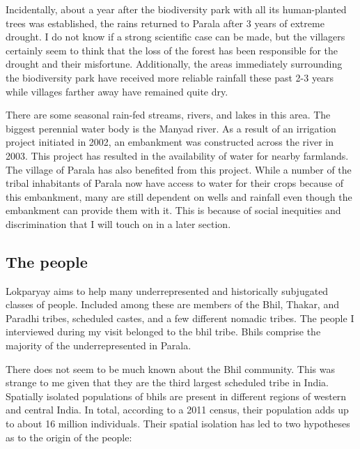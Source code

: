 \documentclass{article}
\begin{document}
Incidentally, about a year after the biodiversity park with all its human-planted trees was established, the rains returned to Parala after 3 years of extreme drought. I do not know if a strong scientific case can be made, but the villagers certainly seem to think that the loss of the forest has been responsible for the drought and their misfortune. Additionally, the areas immediately surrounding the biodiversity park have received more reliable rainfall these past 2-3 years while villages farther away have remained quite dry. 

There are some seasonal rain-fed streams, rivers, and lakes in this area. The biggest perennial water body is the Manyad river. As a result of an irrigation project initiated in 2002, an embankment was constructed across the river in 2003. This project has resulted in the availability of water for nearby farmlands. The village of Parala has also benefited from this project. While a number of the tribal inhabitants of Parala now have access to water for their crops because of this embankment, many are still dependent on wells and rainfall even though the embankment can provide them with it. This is because of social inequities and discrimination that I will touch on in a later section.

\clearpage\subsection{The people}

Lokparyay aims to help many underrepresented and historically subjugated classes of people. Included among these are members of the Bhil, Thakar, and Paradhi tribes, scheduled castes, and a few different nomadic tribes. The people I interviewed during my visit belonged to the bhil tribe. Bhils comprise the majority of the underrepresented in Parala.

There does not seem to be much known about the Bhil community. This was strange to me given that they are the third largest scheduled tribe in India. Spatially isolated populations of bhils are present in different regions of western and central India. In total, according to a 2011 census, their population adds up to about 16 million individuals. Their spatial isolation has led to two hypotheses as to the origin of the people: 
\end{document}
